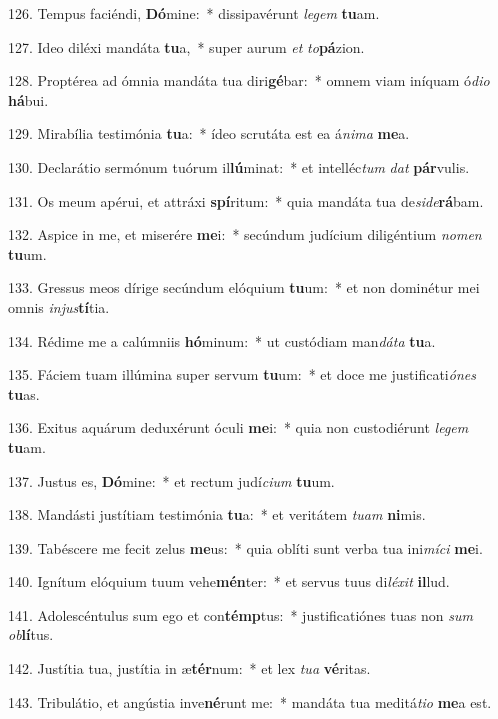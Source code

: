 126. Tempus faciéndi, \textbf{Dó}mine:~*  dissipavérunt \textit{le}\textit{gem} \textbf{tu}am.\

127. Ideo diléxi mandáta \textbf{tu}a,~*  super aurum \textit{et} \textit{to}\textbf{pá}zion.\

128. Proptérea ad ómnia mandáta tua diri\textbf{gé}bar:~*  omnem viam iníquam ó\textit{di}\textit{o} \textbf{há}bui.\

129. Mirabília testimónia \textbf{tu}a:~*  ídeo scrutáta est ea á\textit{ni}\textit{ma} \textbf{me}a.\

130. Declarátio sermónum tuórum il\textbf{lú}minat:~*  et intelléc\textit{tum} \textit{dat} \textbf{pár}vulis.\

131. Os meum apérui, et attráxi \textbf{spí}ritum:~*  quia mandáta tua de\textit{si}\textit{de}\textbf{rá}bam.\

132. Aspice in me, et miserére \textbf{me}i:~*  secúndum judícium diligéntium \textit{no}\textit{men} \textbf{tu}um.\

133. Gressus meos dírige secúndum elóquium \textbf{tu}um:~*  et non dominétur mei omnis \textit{in}\textit{jus}\textbf{tí}tia.\

134. Rédime me a calúmniis \textbf{hó}minum:~*  ut custódiam man\textit{dá}\textit{ta} \textbf{tu}a.\

135. Fáciem tuam illúmina super servum \textbf{tu}um:~*  et doce me justificati\textit{ó}\textit{nes} \textbf{tu}as.\

136. Exitus aquárum deduxérunt óculi \textbf{me}i:~*  quia non custodiérunt \textit{le}\textit{gem} \textbf{tu}am.\

137. Justus es, \textbf{Dó}mine:~*  et rectum judí\textit{ci}\textit{um} \textbf{tu}um.\

138. Mandásti justítiam testimónia \textbf{tu}a:~*  et veritátem \textit{tu}\textit{am} \textbf{ni}mis.\

139. Tabéscere me fecit zelus \textbf{me}us:~*  quia oblíti sunt verba tua ini\textit{mí}\textit{ci} \textbf{me}i.\

140. Ignítum elóquium tuum vehe\textbf{mén}ter:~*  et servus tuus di\textit{lé}\textit{xit} \textbf{il}lud.\

141. Adolescéntulus sum ego et con\textbf{témp}tus:~*  justificatiónes tuas non \textit{sum} \textit{ob}\textbf{lí}tus.\

142. Justítia tua, justítia in æ\textbf{tér}num:~*  et lex \textit{tu}\textit{a} \textbf{vé}ritas.\

143. Tribulátio, et angústia inve\textbf{né}runt me:~*  mandáta tua meditá\textit{ti}\textit{o} \textbf{me}a est.\

